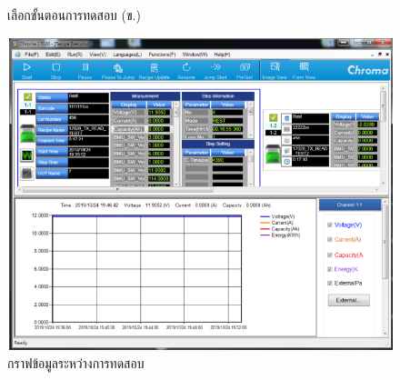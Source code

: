 \begin{center}
\begin{figure}[H]
		\centering
		\captionsetup{justification=centering,margin=2cm}
		\caption{เลือกขั้นตอนการทดสอบ (ข.)}
		\label{fig:recipe_setup_win}
	\end{figure}
	\begin{figure}[H]
		\includegraphics[width=1\linewidth]{Chapters/img/17020_Program/Recipe_Executor/ch_graph.png}
		\centering
		\captionsetup{justification=centering,margin=2cm}
		\caption{กราฟข้อมูลระหว่างการทดสอบ}
		\label{fig:ch_graph}
	\end{figure}
\end{center}
